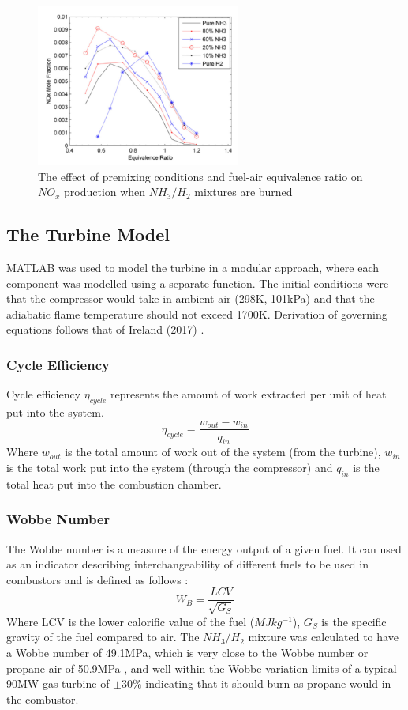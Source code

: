 \begin{figure} [h]
\centering
\includegraphics[width=0.6\textwidth]{./pictures/NOxemissions.png}
  \caption{The effect of premixing conditions and fuel-air equivalence ratio on $NO_x$ production when $NH_3/H_2$ mixtures are burned \cite{Nozari2015}} \label{fig:NOxemissions}
  \end{figure}
\subsection{The Turbine Model}
MATLAB was used to model the turbine in a modular approach, where each component was modelled using a separate function. The initial conditions were that the compressor would take in ambient air (298K, 101kPa) and that the adiabatic flame temperature should not exceed 1700K. Derivation of governing equations follows that of Ireland (2017) \cite{thermonotes}.

\subsubsection{Cycle Efficiency}
Cycle efficiency $\eta_{cycle}$ represents the amount of work extracted per unit of heat put into the system.
\begin{equation}
\eta_{cycle} = \frac{w_{out} - w_{in}}{q_{in}}
\end{equation}
Where $w_{out}$ is the total amount of work out of the system (from the turbine), $w_{in}$ is the total work put into the system (through the compressor) and $q_{in}$ is the total heat put into the combustion chamber.

\subsubsection{Wobbe Number} 
The Wobbe number is a measure of the energy output of a given fuel. It can used as an indicator describing interchangeability of different fuels to be used in combustors and is defined as follows \cite{website:wobbe}: 
\begin{equation}
W_B = \frac{LCV}{\sqrt{G_S}}
\end{equation}
Where LCV is the lower calorific value of the fuel ($MJ kg^{-1}$), $G_S$ is the specific gravity of the fuel compared to air. The $NH_3/H_2$ mixture was calculated to have a Wobbe number of 49.1MPa, which is very close to the Wobbe number or propane-air of 50.9MPa \cite{website:wobbe}, and well within the Wobbe variation limits of a typical 90MW gas turbine of $\pm 30\%$ \cite{PDF:GE} indicating that it should burn as propane would in the combustor. 

